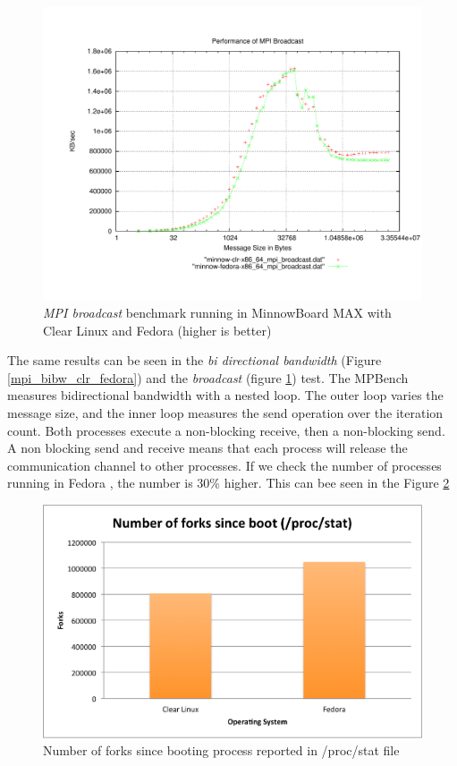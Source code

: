 \begin{figure}[H]
\centering
\includegraphics[width=1 \textwidth]{images/mpbench_clr_experiments/mpi_broadcast.pdf}
\caption{\textit{MPI broadcast} benchmark running in  MinnowBoard MAX with Clear Linux and
Fedora (higher is better)}
\label{mpi_broadcast_clr_fedora}
\end{figure}

The same results can be seen in the \textit{bi directional bandwidth} (Figure
\ref{mpi_bibw_clr_fedora}) and the \textit{broadcast} (figure
\ref{mpi_broadcast_clr_fedora}) test. The MPBench measures
bidirectional bandwidth with a nested loop. The outer loop varies the
message size, and the inner loop measures the send operation over the iteration
count. Both processes execute a non-blocking receive, then a non-blocking send.
A non blocking send and receive means that each process will release the
communication channel to other processes. If we check the number of processes
running in Fedora , the number is 30\% higher. This can bee seen in the Figure
\ref{number_forks_fedora_clr}

\begin{figure}[H]
\centering
\includegraphics[width=1 \textwidth]{images/number_forks.png}
\caption{Number of forks since booting process reported in /proc/stat file }
\label{number_forks_fedora_clr}
\end{figure}

